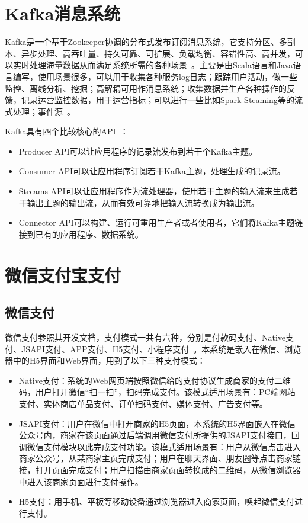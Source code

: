 \section{Kafka消息系统}
Kafka是一个基于Zookeeper协调的分布式发布订阅消息系统，它支持分区、多副本、异步处理、高吞吐量、持久可靠、可扩展、负载均衡、容错性高、高并发，可以实时处理海量数据从而满足系统所需的各种场景~\cite{deleuze1986kafka}。主要是由Scala语言和Java语言编写，使用场景很多，可以用于收集各种服务log日志；跟踪用户活动，做一些监控、离线分析、挖掘；高解耦可用作消息系统；收集数据并生产各种操作的反馈，记录运营监控数据，用于运营指标；可以进行一些比如Spark Steaming等的流式处理；事件源~\cite{kafka1979basic}。

Kafka具有四个比较核心的API~\cite{kreps2011kafka}：
\begin{itemize}
    \item Producer API可以让应用程序的记录流发布到若干个Kafka主题。
    \item Consumer API可以让应用程序订阅若干Kafka主题，处理生成的记录流。
    \item Streams API可以让应用程序作为流处理器，使用若干主题的输入流来生成若干输出主题的输出流，从而有效可靠地把输入流转换成为输出流。
    \item Connector API可以构建、运行可重用生产者或者使用者，它们将Kafka主题链接到已有的应用程序、数据系统。
\end{itemize}

\section{微信支付宝支付}
\subsection{微信支付}
微信支付参照其开发文档，支付模式一共有六种，分别是付款码支付、Native支付、JSAPI支付、APP支付、H5支付、小程序支付~\cite{xu2017study}。本系统是嵌入在微信、浏览器中的H5界面和Web界面，用到了以下三种支付模式：
\begin{itemize}
    \item Native支付：系统的Web网页端按照微信给的支付协议生成商家的支付二维码，用户打开微信“扫一扫”，扫码完成支付。该模式适用场景有：PC端网站支付、实体商店单品支付、订单扫码支付、媒体支付、广告支付等。
    \item JSAPI支付：用户在微信中打开商家的H5页面，本系统的H5界面嵌入在微信公众号内，商家在该页面通过后端调用微信支付所提供的JSAPI支付接口，回调微信支付模块以此完成支付功能。该模式适用场景有：用户从微信点击进入商家公众号，从某商家主页完成支付；用户在聊天界面、朋友圈等点击商家链接，打开页面完成支付；用户扫描由商家页面转换成的二维码，从微信浏览器中进入该商家页面进行支付操作。
    \item 	H5支付：用手机、平板等移动设备通过浏览器进入商家页面，唤起微信支付进行支付。
\end{itemize}

